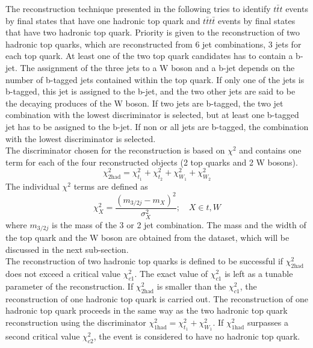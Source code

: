 The reconstruction technique presented in the following tries to identify $t\bar{t}t$ events by final states that have one hadronic top quark and $t\bar{t}t\bar{t}$ events by final states that have two hadronic top quark. Priority is given to the reconstruction of two hadronic top quarks, which are reconstructed from 6 jet combinations, 3 jets for each top quark. At least one of the two top quark candidates has to contain a b-jet. The assignment of the three jets to a W boson and a b-jet depends on the number of b-tagged jets contained within the top quark. If only one of the jets is b-tagged, this jet is assigned to the b-jet, and the two other jets are said to be the decaying produces of the W boson. If two jets are b-tagged, the two jet combination with the lowest discriminator is selected, but at least one b-tagged jet has to be assigned to the b-jet. If non or all jets are b-tagged, the combination with the lowest discriminator is selected. \\  
The discriminator chosen for the reconstruction is based on $\chi^2$ and contains one term for each of the four reconstructed objects (2 top quarks and 2 W bosons). 
\begin{equation}
\label{eq:Chi2had}
\chi^2_{\text{2had}} = \chi^2_{t_1} + \chi^2_{t_2} + \chi^2_{W_1} + \chi^2_{W_2}
\end{equation}
The individual $\chi^2$ terms are defined as
\begin{equation}
\label{eq:Chi2}
\chi^2_X = \frac{(m_{3/2j} - m_X)^2}{\sigma_X^2}; \,\,\,\,\,\, X \in {t,W}
\end{equation}
where $m_{3/2j}$ is the mass of the 3 or 2 jet combination. The mass and the width of the top quark and the W boson are obtained from the dataset, which will be discussed in the next sub-section. \\
The reconstruction of two hadronic top quarks is defined to be successful if $\chi^2_{\text{2had}}$ does not exceed a critical value $\chi^2_{c1}$. The exact value of $\chi^2_{c1}$ is left as a tunable parameter of the reconstruction. If $\chi^2_{\text{2had}}$ is smaller than the $\chi^2_{c1}$, the reconstruction of one hadronic top quark is carried out. The reconstruction of one hadronic top quark proceeds in the same way as the two hadronic top quark reconstruction using the discriminator $\chi^2_{\text{1had}} = \chi^2_{t_1} + \chi^2_{W_1}$. If $\chi^2_{\text{1had}}$ surpasses a second critical value $\chi^2_{c2}$, the event is considered to have no hadronic top quark.

\newpage

